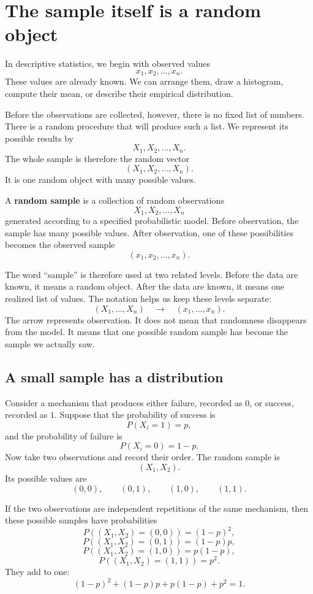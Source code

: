 \section{The sample itself is a random object}

In descriptive statistics, we begin with observed values
\[
x_1,x_2,\ldots,x_n.
\]
These values are already known. We can arrange them, draw a histogram, compute
their mean, or describe their empirical distribution.

Before the observations are collected, however, there is no fixed list of
numbers. There is a random procedure that will produce such a list. We represent
its possible results by
\[
X_1,X_2,\ldots,X_n.
\]
The whole sample is therefore the random vector
\[
(X_1,X_2,\ldots,X_n).
\]
It is one random object with many possible values.

\begin{definitionbox}
A \textbf{random sample} is a collection of random observations
\[
X_1,X_2,\ldots,X_n
\]
generated according to a specified probabilistic model. Before observation, the
sample has many possible values. After observation, one of these possibilities
becomes the observed sample
\[
(x_1,x_2,\ldots,x_n).
\]
\end{definitionbox}

The word ``sample'' is therefore used at two related levels. Before the data are
known, it means a random object. After the data are known, it means one realized
list of values. The notation helps us keep these levels separate:
\[
(X_1,\ldots,X_n)
\quad\longrightarrow\quad
(x_1,\ldots,x_n).
\]
The arrow represents observation. It does not mean that randomness disappears
from the model. It means that one possible random sample has become the sample
we actually saw.

\subsection*{A small sample has a distribution}

Consider a mechanism that produces either failure, recorded as \(0\), or success,
recorded as \(1\). Suppose that the probability of success is
\[
P(X_i=1)=p,
\]
and the probability of failure is
\[
P(X_i=0)=1-p.
\]
Now take two observations and record their order. The random sample is
\[
(X_1,X_2).
\]
Its possible values are
\[
(0,0),\qquad (0,1),\qquad (1,0),\qquad (1,1).
\]

If the two observations are independent repetitions of the same mechanism, then
these possible samples have probabilities
\[
P((X_1,X_2)=(0,0))=(1-p)^2,
\]
\[
P((X_1,X_2)=(0,1))=(1-p)p,
\]
\[
P((X_1,X_2)=(1,0))=p(1-p),
\]
\[
P((X_1,X_2)=(1,1))=p^2.
\]
They add to one:
\[
(1-p)^2+(1-p)p+p(1-p)+p^2=1.
\]

